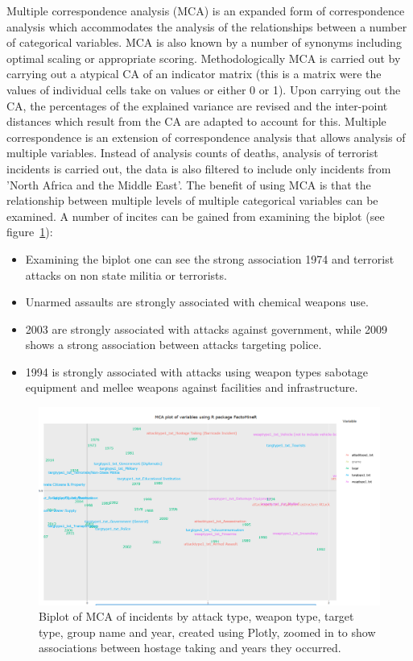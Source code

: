 Multiple correspondence analysis (MCA) is an expanded form of correspondence analysis which accommodates the analysis of the relationships between a number of categorical variables. MCA is also known by a number of synonyms including  optimal scaling  or appropriate scoring. Methodologically MCA is carried out by carrying out a atypical CA of an indicator matrix (this is a matrix were the values of individual cells take on values or either 0 or 1). Upon carrying out the CA, the percentages of the explained variance are revised and the inter-point distances which result from the CA are adapted to account for this. Multiple correspondence is an extension of correspondence analysis that allows analysis of multiple variables. Instead of analysis counts of deaths, analysis of terrorist incidents is carried out, the data is also filtered to include only incidents from 'North Africa and the Middle East'. The benefit of using MCA is that the relationship between multiple levels of multiple categorical variables can be examined. A number of incites can be gained from examining the biplot (see figure~\ref{fig:biplotmca}):
\begin{itemize}
\item Examining the biplot one can see the strong association 1974 and terrorist attacks on non state militia or terrorists.
\item Unarmed assaults are strongly associated with chemical weapons use.
\item 2003 are strongly associated with attacks against government, while 2009 shows a strong association between attacks targeting police.  
\item 1994 is strongly associated with attacks using weapon types sabotage equipment and mellee weapons against facilities and infrastructure.
\end{itemize}

\begin{figure}[t]
\includegraphics[width=15cm]{Peters_experiment_markdown_files/figure-latex/newplot3.png}
\caption{Biplot of MCA of incidents by attack type, weapon type, target type, group name and year, created using Plotly, zoomed in to show associations between hostage taking and years they occurred.}
\label{fig:biplotmca}
\centering
\end{figure}

